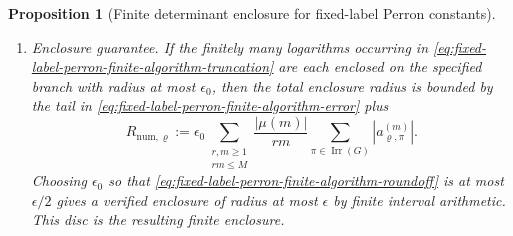 \documentclass[11pt,a4paper]{amsart}
\theoremstyle{plain}
\newtheorem{proposition}[theorem]{Proposition}
\theoremstyle{definition}
\theoremstyle{remark}
\DeclareMathOperator{\Irr}{Irr}
\DeclareMathOperator{\Log}{Log}
\newcommand{\abs}[1]{\lvert #1 \rvert}
\begin{document}
\begin{proposition}[Finite determinant enclosure for fixed-label Perron constants]
\begin{enumerate}[label=\textup{(\alph*)},leftmargin=*]
\begin{equation}
          a_{\varrho,\pi}^{(m)}
          \Log\det(I-\lambda^{-rm}A_\pi)^{-1},
      \end{equation}
      where the scalar Perron term \((1,1,\mathbf1)\) has already been
      omitted, the only possible \(rm=1\) terms use the non-trivial Abel
      branch from \textup{(c)}, and all \(rm\ge2\) terms use the ordinary germ value
      inside the Perron disc.  The truncation error is the effective tail
      estimate
      \begin{equation}\label{eq:fixed-label-perron-finite-algorithm-error}
        \abs{F_\varrho(\lambda^{-1})-F_\varrho^{(M)}}
        \le
        C_\varrho
        \sum_{k>M}\frac{\mathrm d(k)}{k}\lambda^{1-k},
      \end{equation}
      for a constant \(C_\varrho\) depending only on the finite determinant
      collection and \(\varrho\).  The rational tail bound gives
      \begin{equation}\label{eq:fixed-label-rational-tail-envelope}
        C_\varrho
        \sum_{k>M}\frac{\mathrm d(k)}{k}\lambda^{1-k}
        \le
        Q_\varrho\frac{\theta^{M+1}}{1-\theta},
      \end{equation}
      because \(\mathrm d(k)\le k\).  Thus the truncations converge absolutely
      and exponentially, and the same finite procedure gives verified
      interval enclosures by truncating after the displayed rational tail
      bound.
    \item \emph{Enclosure guarantee.}  If
      the finitely many logarithms occurring in
      \eqref{eq:fixed-label-perron-finite-algorithm-truncation} are each
      enclosed on the specified branch with radius at most \(\epsilon_0\), then
      the total enclosure radius is bounded by the tail in
      \eqref{eq:fixed-label-perron-finite-algorithm-error} plus
      \begin{equation}\label{eq:fixed-label-perron-finite-algorithm-roundoff}
        R_{\mathrm{num},\varrho}:=\epsilon_0
        \sum_{\substack{r,m\ge1\\rm\le M}}
          \frac{|\mu(m)|}{rm}
          \sum_{\pi\in\Irr(G)}|a_{\varrho,\pi}^{(m)}| .
      \end{equation}
      Choosing \(\epsilon_0\) so that
      \eqref{eq:fixed-label-perron-finite-algorithm-roundoff} is at most
      \(\epsilon/2\) gives a verified enclosure of radius at most
      \(\epsilon\) by finite interval arithmetic.  This disc is the resulting finite enclosure.
  \end{enumerate}
\end{proposition}
\end{document}
